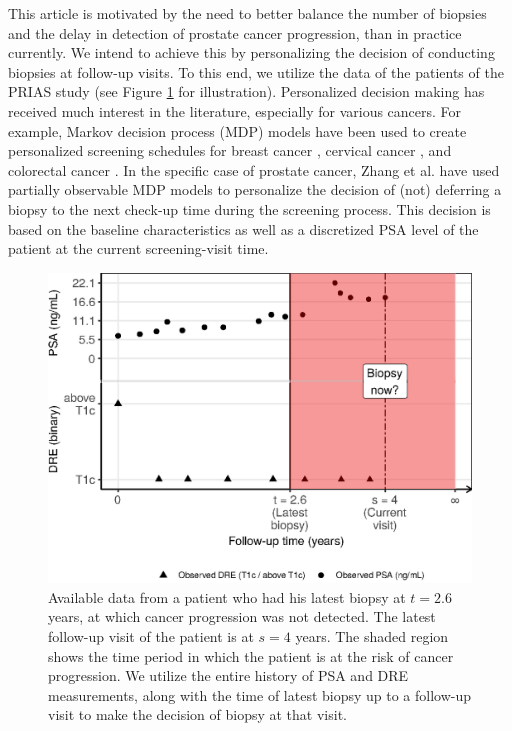 This article is motivated by the need to better balance the number of biopsies and the delay in detection of prostate cancer progression, than in practice currently. We intend to achieve this by personalizing the decision of conducting biopsies at follow-up visits. To this end, we utilize the data of the patients of the PRIAS study (see Figure \ref{fig:obsDataPlot_2340} for illustration). Personalized decision making has received much interest in the literature, especially for various cancers. For example, Markov decision process (MDP) models have been used to create personalized screening schedules for breast cancer \cite{ayer2012or}, cervical cancer \cite{akhavan2017markov}, and colorectal cancer \cite{erenay2014optimizing}. In the specific case of prostate cancer, Zhang et al. \cite{zhang2012optimization} have used partially observable MDP models to personalize the decision of (not) deferring a biopsy to the next check‐up time during the screening process. This decision is based on the baseline characteristics as well as a discretized PSA level of the patient at the current screening-visit time.
\begin{figure}[!htb]
\captionsetup{justification=justified}
\centerline{\includegraphics[width=\columnwidth]{images/obsDataPlot_2340.eps}}
\caption{Available data from a patient who had his latest biopsy at $t=2.6$ years, at which cancer progression was not detected. The latest follow-up visit of the patient is at $s=4$ years. The shaded region shows the time period in which the patient is at the risk of cancer progression. We utilize the entire history of PSA and DRE measurements, along with the time of latest biopsy up to a follow-up visit to make the decision of biopsy at that visit.}
\label{fig:obsDataPlot_2340}
\end{figure}

